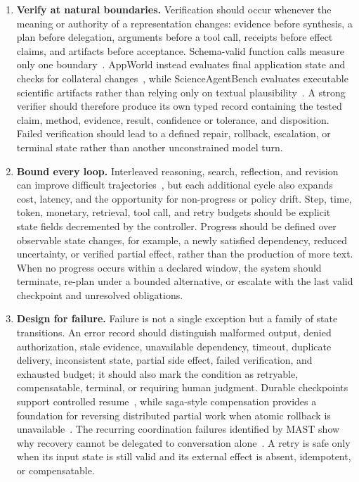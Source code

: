 \begin{enumerate}
    \item \textbf{Verify at natural boundaries.} Verification should occur whenever the meaning or authority of a representation changes: evidence before synthesis, a plan before delegation, arguments before a tool call, receipts before effect claims, and artifacts before acceptance. Schema-valid function calls measure only one boundary~\cite{patil2025bfcl}. AppWorld instead evaluates final application state and checks for collateral changes~\cite{trivedi2024appworld}, while ScienceAgentBench evaluates executable scientific artifacts rather than relying only on textual plausibility~\cite{chen2025scienceagentbench}. A strong verifier should therefore produce its own typed record containing the tested claim, method, evidence, result, confidence or tolerance, and disposition. Failed verification should lead to a defined repair, rollback, escalation, or terminal state rather than another unconstrained model turn.

    \item \textbf{Bound every loop.} Interleaved reasoning, search, reflection, and revision can improve difficult trajectories~\cite{yao2023react,yao2023treeofthoughts,shinn2023reflexion}, but each additional cycle also expands cost, latency, and the opportunity for non-progress or policy drift. Step, time, token, monetary, retrieval, tool call, and retry budgets should be explicit state fields decremented by the controller. Progress should be defined over observable state changes, for example, a newly satisfied dependency, reduced uncertainty, or verified partial effect, rather than the production of more text. When no progress occurs within a declared window, the system should terminate, re-plan under a bounded alternative, or escalate with the last valid checkpoint and unresolved obligations.

    \item \textbf{Design for failure.} Failure is not a single exception but a family of state transitions. An error record should distinguish malformed output, denied authorization, stale evidence, unavailable dependency, timeout, duplicate delivery, inconsistent state, partial side effect, failed verification, and exhausted budget; it should also mark the condition as retryable, compensatable, terminal, or requiring human judgment. Durable checkpoints support controlled resume~\cite{langgraph2026persistence}, while saga-style compensation provides a foundation for reversing distributed partial work when atomic rollback is unavailable~\cite{garciamolina1987sagas}. The recurring coordination failures identified by MAST show why recovery cannot be delegated to conversation alone~\cite{cemri2025mast}. A retry is safe only when its input state is still valid and its external effect is absent, idempotent, or compensatable.


\end{enumerate}

